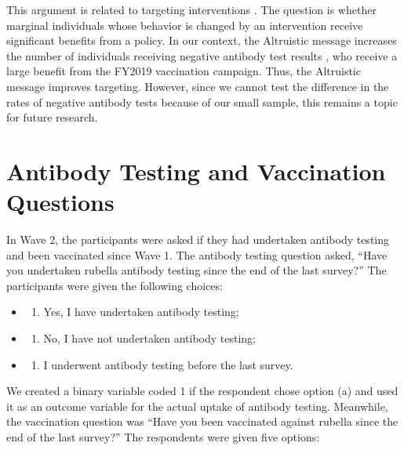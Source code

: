 \documentclass[
]{article}
\providecommand{\tightlist}{%
  \setlength{\itemsep}{0pt}\setlength{\parskip}{0pt}}
\begin{document}
This argument is related to targeting interventions \citep[e.g.,][]{Finkelstein2019}. The question is whether marginal individuals whose behavior is changed by an intervention receive significant benefits from a policy. In our context, the Altruistic message increases the number of individuals receiving negative antibody test results , who receive a large benefit from the FY2019 vaccination campaign. Thus, the Altruistic message improves targeting. However, since we cannot test the difference in the rates of negative antibody tests because of our small sample, this remains a topic for future research.

\clearpage

\hypertarget{appendix-appendix}{%
\appendix}


\hypertarget{question}{%
\section{Antibody Testing and Vaccination Questions}\label{question}}

In Wave 2, the participants were asked if they had undertaken antibody testing and been vaccinated since Wave 1. The antibody testing question asked, ``Have you undertaken rubella antibody testing since the end of the last survey?'' The participants were given the following choices:

\begin{itemize}
\item
  \begin{enumerate}
  \def\labelenumi{(\alph{enumi})}
  \tightlist
  \item
    Yes, I have undertaken antibody testing;
  \end{enumerate}
\item
  \begin{enumerate}
  \def\labelenumi{(\alph{enumi})}
  \setcounter{enumi}{1}
  \tightlist
  \item
    No, I have not undertaken antibody testing;
  \end{enumerate}
\item
  \begin{enumerate}
  \def\labelenumi{(\alph{enumi})}
  \setcounter{enumi}{2}
  \tightlist
  \item
    I underwent antibody testing before the last survey.
  \end{enumerate}
\end{itemize}

We created a binary variable coded 1 if the respondent chose option (a) and used it as an outcome variable for the actual uptake of antibody testing. Meanwhile, the vaccination question was ``Have you been vaccinated against rubella since the end of the last survey?'' The respondents were given five options:
\end{document}
